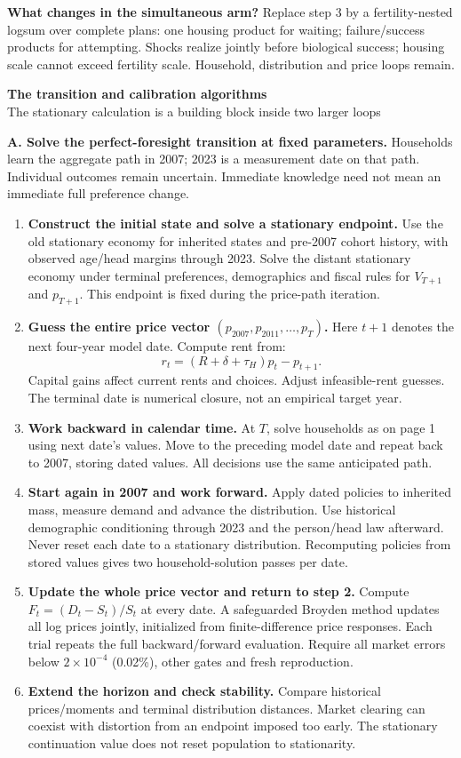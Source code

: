 \documentclass[10pt]{article}
\newcommand{\lead}[1]{\textbf{\color{ink}#1}}
\begin{document}
\lead{What changes in the simultaneous arm?} Replace step 3 by a fertility-nested logsum over complete plans: one housing product for waiting; failure/success products for attempting. Shocks realize jointly before biological success; housing scale cannot exceed fertility scale. Household, distribution and price loops remain.

\newpage
\begin{center}
{\Large\bfseries The transition and calibration algorithms}\\[3pt]
{\small The stationary calculation is a building block inside two larger loops}
\end{center}

\lead{A. Solve the perfect-foresight transition at fixed parameters.}
Households learn the aggregate path in 2007; 2023 is a measurement date on that path. Individual outcomes remain uncertain. Immediate knowledge need not mean an immediate full preference change.

\begin{enumerate}
\item \textbf{Construct the initial state and solve a stationary endpoint.} Use the old stationary economy for inherited states and pre-2007 cohort history, with observed age/head margins through 2023. Solve the distant stationary economy under terminal preferences, demographics and fiscal rules for $V_{T+1}$ and $p_{T+1}$. This endpoint is fixed during the price-path iteration.
\item \textbf{Guess the entire price vector $(p_{2007},p_{2011},\ldots,p_T)$.} Here $t+1$ denotes the next four-year model date. Compute rent from:
\[
 r_t=(R+\delta+\tau_H)p_t-p_{t+1}.
\]
Capital gains affect current rents and choices. Adjust infeasible-rent guesses. The terminal date is numerical closure, not an empirical target year.
\item \textbf{Work backward in calendar time.} At $T$, solve households as on page 1 using next date's values. Move to the preceding model date and repeat back to 2007, storing dated values. All decisions use the same anticipated path.
\item \textbf{Start again in 2007 and work forward.} Apply dated policies to inherited mass, measure demand and advance the distribution. Use historical demographic conditioning through 2023 and the person/head law afterward. Never reset each date to a stationary distribution. Recomputing policies from stored values gives two household-solution passes per date.
\item \textbf{Update the whole price vector and return to step 2.} Compute $F_t=(D_t-S_t)/S_t$ at every date. A safeguarded Broyden method updates all log prices jointly, initialized from finite-difference price responses. Each trial repeats the full backward/forward evaluation. Require all market errors below $2\times10^{-4}$ (0.02\%), other gates and fresh reproduction.
\item \textbf{Extend the horizon and check stability.} Compare historical prices/moments and terminal distribution distances. Market clearing can coexist with distortion from an endpoint imposed too early. The stationary continuation value does not reset population to stationarity.
\end{enumerate}
\end{document}
